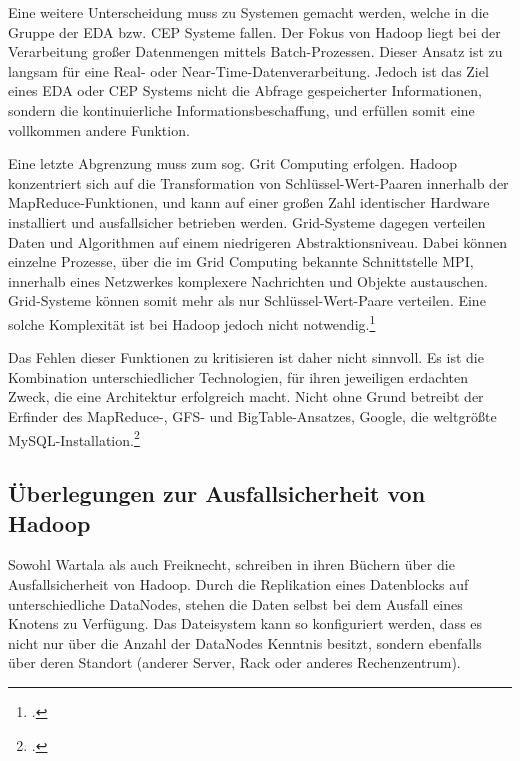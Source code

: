 Eine weitere Unterscheidung muss zu Systemen gemacht werden, welche in die Gruppe der \ac{EDA} bzw. \ac{CEP} Systeme fallen. Der Fokus von Hadoop liegt bei der Verarbeitung großer Datenmengen mittels Batch-Prozessen. Dieser Ansatz ist zu langsam für eine Real- oder Near-Time-Datenverarbeitung. Jedoch ist das Ziel eines \ac{EDA} oder \ac{CEP} Systems nicht die Abfrage gespeicherter Informationen, sondern die kontinuierliche Informationsbeschaffung, und erfüllen somit eine vollkommen andere Funktion.

Eine letzte Abgrenzung muss zum sog. Grit Computing erfolgen. Hadoop konzentriert sich auf die Transformation von Schlüssel-Wert-Paaren innerhalb der MapReduce-Funktionen, und kann auf einer großen Zahl identischer Hardware installiert und ausfallsicher betrieben werden. Grid-Systeme dagegen verteilen Daten und Algorithmen auf einem niedrigeren Abstraktionsniveau. Dabei können einzelne Prozesse, über die im Grid Computing bekannte Schnittstelle \ac{MPI}, innerhalb eines Netzwerkes komplexere Nachrichten und Objekte austauschen. Grid-Systeme können somit mehr als nur Schlüssel-Wert-Paare verteilen. Eine solche Komplexität ist bei Hadoop jedoch nicht notwendig.\footcite[Vgl.][S. 30-33]{Wartala.2012}

Das Fehlen dieser Funktionen zu kritisieren ist daher nicht sinnvoll. Es ist die Kombination unterschiedlicher Technologien, für ihren jeweiligen erdachten Zweck, die eine Architektur erfolgreich macht. \flqq Nicht ohne Grund betreibt der Erfinder des MapReduce-, \ac{GFS}- und BigTable-Ansatzes, Google, die weltgrößte MySQL-Installation.\frqq\footcite[S. 31]{Wartala.2012}


\subsection{Überlegungen zur Ausfallsicherheit von Hadoop}
Sowohl Wartala als auch Freiknecht, schreiben in ihren Büchern über die Ausfallsicherheit von Hadoop. Durch die Replikation eines Datenblocks auf unterschiedliche DataNodes, stehen die Daten selbst bei dem Ausfall eines Knotens zu Verfügung. Das Dateisystem kann so konfiguriert werden, dass es nicht nur über die Anzahl der DataNodes Kenntnis besitzt, sondern ebenfalls über deren Standort (anderer Server, Rack oder anderes Rechenzentrum).

